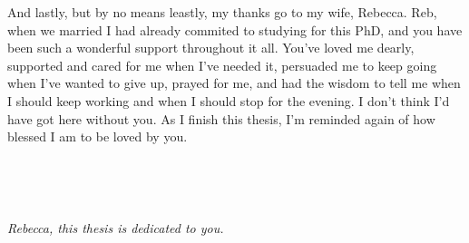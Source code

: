 {And lastly, but by no means leastly, my thanks go to my wife, Rebecca. Reb, when we married I had already commited to studying for this PhD, and you have been such a wonderful support throughout it all. You've loved me dearly, supported and cared for me when I've needed it, persuaded me to keep going when I've wanted to give up, prayed for me, and had the wisdom to tell me when I should keep working and when I should stop for the evening. I don't think I'd have got here without you. As I finish this thesis, I'm reminded again of how blessed I am to be loved by you.

\

\

\begin{center}
  {\it Rebecca, this thesis is dedicated to you.}
  \end{center}
}
